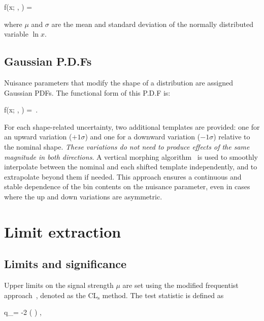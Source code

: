 \begin{equation_pad}
f(x; \mu, \sigma) =  
\exp{}
\end{equation_pad}
where $\mu$ and $\sigma$ are the mean and standard deviation of the normally distributed variable $\ln x$.

\subsection{Gaussian P.D.Fs}  
Nuisance parameters that modify the shape of a distribution are assigned Gaussian PDFs. The functional form of this \ac{P.D.F} is:

\begin{equation_pad}
f(x; \mu, \sigma) =  
\exp{} \,.
\end{equation_pad}

For each shape-related uncertainty, two additional templates are provided: one for an upward variation ($+1\sigma$) and one for a downward variation ($-1\sigma$) relative to the nominal shape. \textit{These variations do not need to produce effects of the same magnitude in both directions}. A vertical morphing algorithm~\cite{Conway:2011in} is used to smoothly interpolate between the nominal and each shifted template independently, and to extrapolate beyond them if needed. This approach ensures a continuous and stable dependence of the bin contents on the nuisance parameter, even in cases where the up and down variations are asymmetric.

\section{Limit extraction}
\label{Section:Chapter6_LimitExtraction}

\subsection{Limits and significance}

Upper limits on the signal strength $\mu$ are set using the modified frequentist approach~\cite{Junk:1999kv,Read:2002hq}, denoted as the CL$_\mathrm{s}$ method. The test statistic is defined as

\begin{equation_pad}
q_\mu = -2 \ln \left(  \right) \quad ,  \leq \hat{\mu} \leq \mu
\end{equation_pad}

